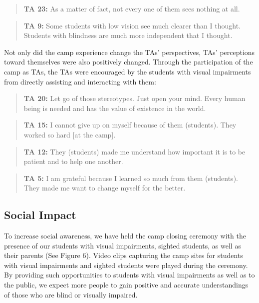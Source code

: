 \documentclass[11.5pt]{sig-alternate} %
\begin{document}
\begin{large}
\begin{quote}
\textbf{TA 23:} As a matter of fact, not every one of them sees nothing at all.
\end{quote}

\begin{quote}
\textbf{TA 9:} Some students with low vision see much clearer than I thought. Students with blindness are much more independent that I thought.
\end{quote}

Not only did the camp experience change the TAs’ perspectives, TAs’ perceptions toward themselves were also positively changed. Through the participation of the camp as TAs, the TAs were encouraged by the students with visual impairments from directly assisting and interacting with them:

\begin{quote}
\textbf{TA 20:} Let go of those stereotypes. Just open your mind. Every human being is needed and has the value of existence in the world.
\end{quote}

\begin{quote}
\textbf{TA 15:} I cannot give up on myself because of them (students). They worked so hard [at the camp].
\end{quote}

\begin{quote}
\textbf{TA 12:} They (students) made me understand how important it is to be patient and to help one another.
\end{quote}

\begin{quote}
\textbf{TA 5:} I am grateful because I learned so much from them (students). They made me want to change myself for the better.
\end{quote}

\subsection*{Social Impact}

To increase social awareness, we have held the camp closing ceremony with the presence of our students with visual impairments, sighted students, as well as their parents (See Figure 6). Video clips capturing the camp sites for students with visual impairments and sighted students were played during the ceremony. By providing such opportunities to students with visual impairments as well as to the public, we expect more people to gain positive and accurate understandings of those who are blind or visually impaired.


\end{large}
\end{document}
